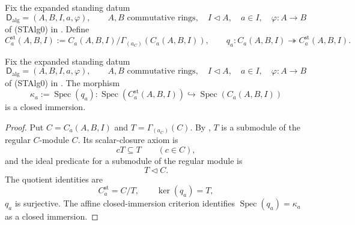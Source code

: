 \begin{definition}
  \label{def:nagata-strict-transform-chart-ring}

  Fix the expanded standing datum
  \[
    \mathsf D_{\mathrm{alg}}=(A,B,I,a,\varphi),\qquad
    A,B\text{ commutative rings},\quad
    I\triangleleft A,\quad a\in I,\quad
    \varphi\colon A\to B
  \]
  of (STAlg0) in
  .
  Define
  \[
    C_a^{\mathrm{st}}(A,B,I)
      :=C_a(A,B,I)/\Gamma_{(a_C)}(C_a(A,B,I)),
    \qquad
    q_a\colon C_a(A,B,I)\twoheadrightarrow C_a^{\mathrm{st}}(A,B,I).
  \]
\end{definition}

\begin{lemma}
  \label{lemma:nagata-strict-transform-chart-closed}

  Fix the expanded standing datum
  \[
    \mathsf D_{\mathrm{alg}}=(A,B,I,a,\varphi),\qquad
    A,B\text{ commutative rings},\quad
    I\triangleleft A,\quad a\in I,\quad
    \varphi\colon A\to B
  \]
  of (STAlg0) in
  .
  The morphism
  \[
    \kappa_a:=\operatorname{Spec}(q_a)\colon
      \operatorname{Spec}(C_a^{\mathrm{st}}(A,B,I))
      \hookrightarrow\operatorname{Spec}(C_a(A,B,I))
  \]
  is a closed immersion.
\end{lemma}

\begin{proof}
  Put $C=C_a(A,B,I)$ and $T=\Gamma_{(a_C)}(C)$.  By
  , $T$ is a submodule of the
  regular $C$-module $C$.  Its scalar-closure axiom is
  \[
    cT\subseteq T\qquad(c\in C),
  \]
  and the ideal predicate for a submodule of the regular module is
  \[
    T\triangleleft C.
  \]
  The quotient identities are
  \[
    C_a^{\mathrm{st}}=C/T,\qquad\ker(q_a)=T,
  \]
  $q_a$ is surjective.  The affine closed-immersion criterion identifies
  $\operatorname{Spec}(q_a)=\kappa_a$ as a closed immersion.
\end{proof}

